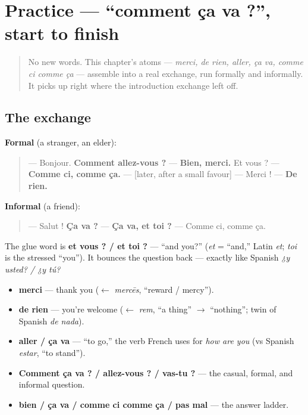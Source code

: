 \section[Practice]{Practice — \textquotedblleft{}comment ça va ?\textquotedblright{}, start to finish}

\label{lesson:FR-C03-practice}



\begin{quote}
No new words. This chapter's atoms — \emph{merci, de rien, aller, ça va, comme ci comme ça} — assemble into a real exchange, run formally and informally. It picks up right where the introduction exchange left off.
\end{quote}

\subsection*{The exchange}
\textbf{Formal} (a stranger, an elder):

\begin{quote}
— Bonjour. \textbf{Comment allez-vous ?} — \textbf{Bien, merci.} Et vous ? — \textbf{Comme ci, comme ça.} — {[}later, after a small favour{]} — Merci ! — \textbf{De rien.}
\end{quote}

\textbf{Informal} (a friend):

\begin{quote}
— Salut ! \textbf{Ça va ?} — \textbf{Ça va, et toi ?} — Comme ci, comme ça.
\end{quote}

The glue word is \textbf{et vous ? / et toi ?} — \textquotedblleft{}and you?\textquotedblright{} (\emph{et} = \textquotedblleft{}and,\textquotedblright{} Latin \emph{et}; \emph{toi} is the stressed \textquotedblleft{}you\textquotedblright{}). It bounces the question back — exactly like Spanish \emph{¿y usted? / ¿y tú?}

\begin{grammarlens}[title={What you've built this chapter}]
\begin{itemize}
\raggedright
  \item \textbf{merci} — thank you ($\leftarrow$ \emph{mercēs}, \textquotedblleft{}reward / mercy\textquotedblright{}).
  \item \textbf{de rien} — you're welcome ($\leftarrow$ \emph{rem}, \textquotedblleft{}a thing\textquotedblright{} $\to$ \textquotedblleft{}nothing\textquotedblright{}; twin of Spanish \emph{de nada}).
  \item \textbf{aller / ça va} — \textquotedblleft{}to go,\textquotedblright{} the verb French uses for \emph{how are you} (vs Spanish \emph{estar}, \textquotedblleft{}to stand\textquotedblright{}).
  \item \textbf{Comment ça va ? / allez-vous ? / vas-tu ?} — the casual, formal, and informal question.
  \item \textbf{bien / ça va / comme ci comme ça / pas mal} — the answer ladder.
\end{itemize}
\end{grammarlens}


